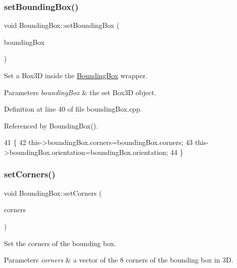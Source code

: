 \subsubsection{\texorpdfstring{set\+Bounding\+Box()}{setBoundingBox()}}
{\footnotesize\ttfamily void Bounding\+Box\+::set\+Bounding\+Box (\begin{DoxyParamCaption}\item[{const i\+Cub\+::data3\+D\+::\+Box3D \&}]{bounding\+Box }\end{DoxyParamCaption})}



Set a Box3D inside the \hyperlink{classiCub_1_1data3D_1_1BoundingBox}{Bounding\+Box} wrapper. 


\begin{DoxyParams}{Parameters}
{\em bounding\+Box} & the set Box3D object. \\
\hline
\end{DoxyParams}


Definition at line 40 of file bounding\+Box.\+cpp.



Referenced by Bounding\+Box().


\begin{DoxyCode}
41 \{
42     this->boundingBox.corners=boundingBox.corners;
43     this->boundingBox.orientation=boundingBox.orientation;
44 \}
\end{DoxyCode}
\label{classiCub_1_1data3D_1_1BoundingBox_a0cf2386f7eb05f18a69ccca09c589c17} 
\subsubsection{\texorpdfstring{set\+Corners()}{setCorners()}}
{\footnotesize\ttfamily void Bounding\+Box\+::set\+Corners (\begin{DoxyParamCaption}\item[{const std\+::vector$<$ i\+Cub\+::data3\+D\+::\+Point\+X\+YZ $>$ \&}]{corners }\end{DoxyParamCaption})}



Set the corners of the bounding box. 


\begin{DoxyParams}{Parameters}
{\em corners} & a vector of the 8 corners of the bounding box in 3D. \\
\hline
\end{DoxyParams}


